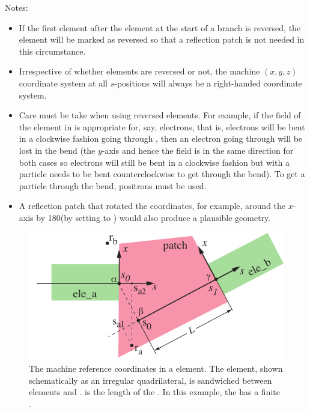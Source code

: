Notes:
\begin{itemize}
\item
If the first element after the  element at the start of a branch is reversed, the
 element will be marked as reversed so that a reflection patch is not needed in
this circumstance.
\item
Irrespective of whether elements are reversed or not, the machine $(x,y,z)$ coordinate system
at all $s$-positions will always be a right-handed coordinate system.
\item
Care must be take when using reversed elements. For example, if the field of the  element in
 is appropriate for, say, electrons, that is, electrons will be bent in a clockwise
fashion going through , then an electron going through  will be lost in the bend
(the $y$-axis and hence the field is in the same direction for both cases so electrons will still be
bent in a clockwise fashion but with  a particle needs to be bent counterclockwise to get
through the bend). To get a particle through the bend, positrons must be used.
\item
A reflection patch that rotated the coordinates, for example, around the $x$-axis by 180\Deg (by
setting  to ) would also produce a plausible geometry.
\end{itemize}


\begin{figure}[bt]
  \centering
  \includegraphics[width=5in]{patch-problem.pdf}
  \caption[The machine reference coordinates in a  element.]
{The machine reference coordinates in a  element. The  element, shown
schematically as an irregular quadrilateral, is sandwiched between elements  and
.  is the length of the . In this example, the  has a finite
.}
  \label{f:patch.prob}
\end{figure}

